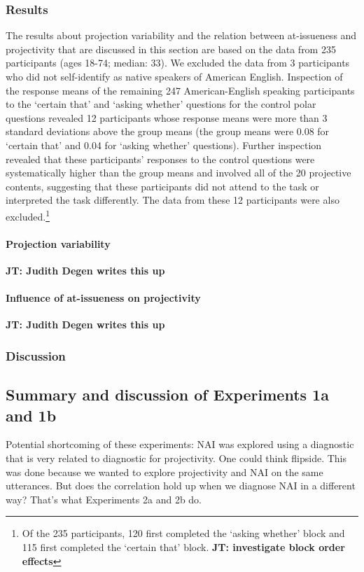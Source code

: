 \documentclass[11pt,fleqn]{article}
\newcommand{\6}{\mbox{$[\hspace*{-.6mm}[$}}
\newcommand{\9}{\mbox{$]\hspace*{-.6mm}]$}}
\newcommand{\jt}[1]{\textbf{\color{blue}JT: #1}}
\begin{document}
\subsubsection{Results}

The results about projection variability and the relation between at-issueness and projectivity that are discussed in this section are based on the data from 235 participants (ages 18-74; median: 33). We excluded the data from 3 participants who did not self-identify as native speakers of American English. Inspection of the response means of the remaining 247 American-English speaking participants to the `certain that' and `asking whether' questions for the control polar questions revealed 12 participants whose response means were more than 3 standard deviations above the group means (the group means were 0.08 for `certain that' and 0.04 for `asking whether' questions). Further inspection revealed that these participants' responses to the control questions were systematically higher than the group means and involved all of the 20 projective contents, suggesting that these participants did not attend to the task or interpreted the task differently. The data from these 12 participants were also excluded.\footnote{Of the 235 participants, 120 first completed the `asking whether' block and 115 first completed the `certain that' block. \jt{investigate block order effects}}

\paragraph{Projection variability} \jt{Judith Degen writes this up}

\paragraph{Influence of at-issueness on projectivity} \jt{Judith Degen writes this up}

\subsubsection{Discussion}

\subsection{Summary and discussion of Experiments 1a and 1b}

Potential shortcoming of these experiments: NAI was explored using a diagnostic that is very related to diagnostic for projectivity. One could think flipside. This was done because we wanted to explore projectivity and NAI on the same utterances. But does the correlation hold up when we diagnose NAI in a different way? That's what Experiments 2a and 2b do.
\end{document}
